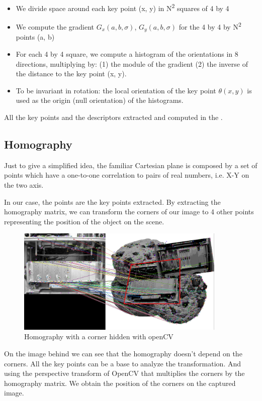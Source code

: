 \documentclass[english,a4paper,11pt]{report}
\newcommand{\ts}{\textsuperscript}
\begin{document}
	\begin{itemize}
			\item We divide space around each key point (x, y) in N\ts{2} squares of 4 by 4 \item We compute the gradient \begin{math}G_{x}(a,b,\sigma)\end{math}, \begin{math}G_{y}(a,b,\sigma)\end{math} for the 4 by 4 by N\ts{2} points (a, b)

		\item For each 4 by 4 square, we compute a histogram of the orientations in 8 directions, multiplying by: (1) the module of the gradient (2) the inverse of the distance to the key point (x, y).
 \item To be invariant in rotation: the local orientation of the key point \begin{math} \theta(x,y) \end{math} is used as the origin (null orientation) of the histograms.		
	\end{itemize}

	\par All the key points and the descriptors extracted and computed in the .
	
	
	\subsection{Homography}
	\par  Just to give a simplified idea, the familiar Cartesian plane is composed by a set of points which have a one-to-one correlation to pairs of real numbers, i.e. X-Y on the two axis\cite{Homography}.
	\par In our case, the points are the key points extracted. By extracting the homography matrix, we can transform the corners of our image to 4 other points representing the position of the object on the scene\cite{TutoHomography}.
	
	\begin{figure}
			\includegraphics[width=10cm]{images_not_compressed/showHomography.png}
			\caption{Homography with a corner hidden with openCV}
	\end{figure}
	\par On the image behind we can see that the homography doesn't depend on the corners. All the key points can be a base to analyze the transformation. And using the perspective transform of OpenCV that multiplies the corners by the homography matrix. We obtain the position of the corners on the captured image.
	
\end{document}

